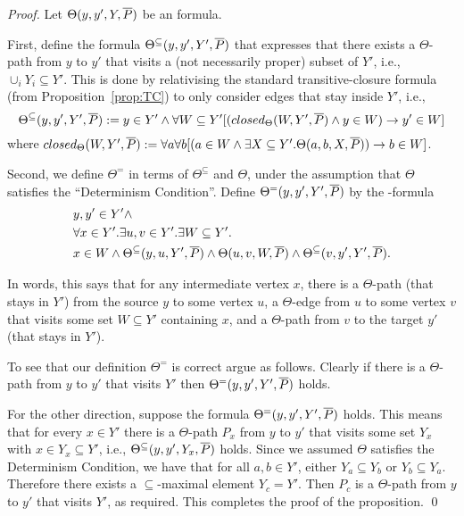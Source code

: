 \begin{proof}
Let $\Theta(y,y',Y,\overline{P})$ be an \msol formula.

First, define the formula $\Theta^\subseteq(y,y',Y',\overline{P})$ that expresses that there exists a $\Theta$-path from $y$ to $y'$ that visits a (not necessarily proper) subset of $Y'$, i.e., $\cup_i Y_i \subseteq Y'$.  This is done by relativising the standard transitive-closure formula (from Proposition~\ref{prop:TC})
to only consider edges that stay inside $Y'$, i.e.,
\[
\Theta^\subseteq(y,y',Y',\overline{P}) :=
y \in Y' \wedge \forall W \subseteq Y' [(closed_{\Theta}(W,Y',\overline{P}) \wedge y \in W) \rightarrow y' \in W]
\]
where $closed_{\Theta}(W,Y',\overline{P}) := \forall a \forall b [(a \in W \wedge \exists X \subseteq Y'. \Theta(a,b,X,\overline{P})) \rightarrow b \in W]$.



Second, we define $\Theta^=$ in terms of $\Theta^\subseteq$ and $\Theta$, under the assumption that $\Theta$ satisfies the ``Determinism Condition''.
Define $\Theta^=(y,y',Y',\overline{P})$ by the \msol-formula
\begin{eqnarray*} \label{eqn:visit}
 & y,y' \in Y' \wedge \\
 & \forall x \in Y'. \exists u,v \in Y'. \exists W \subseteq Y'.\\
 & x \in W \wedge \Theta^\subseteq(y,u,Y',\overline{P}) \wedge   \Theta(u,v,W,\overline{P}) \wedge   \Theta^\subseteq(v,y',Y',\overline{P}).
\end{eqnarray*}

In words, this says that for any intermediate vertex $x$, there is a $\Theta$-path (that stays in $Y'$) from the source $y$ to some vertex $u$, 
a $\Theta$-edge from $u$ to some vertex $v$ that visits some set $W \subseteq Y'$ containing $x$, and a $\Theta$-path from $v$ to the target $y'$ (that stays in $Y'$).

To see that our definition $\Theta^=$ is correct argue as follows.
Clearly if there is a $\Theta$-path from $y$ to $y'$ that visits $Y'$ then $\Theta^=(y,y',Y',\overline{P})$  holds.

For the other direction, suppose the formula $\Theta^=(y,y',Y',\overline{P})$ holds. This means that for every $x \in Y'$ there is a $\Theta$-path $P_x$ from $y$ to $y'$ that visits some set $Y_x$ with $x \in Y_x \subseteq Y'$, i.e., $\Theta^{\subseteq}(y,y',Y_x,\overline{P})$ holds. Since we assumed $\Theta$ satisfies the Determinism Condition, 
we have that for all $a,b \in Y'$, either $Y_a \subseteq Y_b$ or $Y_b \subseteq Y_a$. Therefore there exists a $\subseteq$-maximal element $Y_c = Y'$. Then $P_c$ is a $\Theta$-path from $y$ to $y'$ that visits $Y'$, as required.
This completes the proof of the proposition.
\qed
\end{proof}

